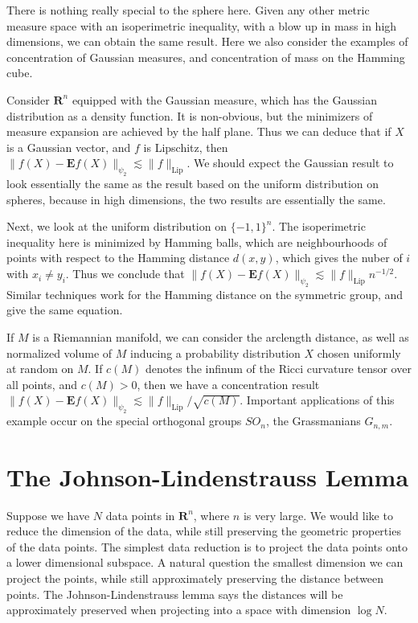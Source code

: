 There is nothing really special to the sphere here. Given any other metric measure space with an isoperimetric inequality, with a blow up in mass in high dimensions, we can obtain the same result. Here we also consider the examples of concentration of Gaussian measures, and concentration of mass on the Hamming cube.

\begin{example}
    Consider $\mathbf{R}^n$ equipped with the Gaussian measure, which has the Gaussian distribution as a density function. It is non-obvious, but the minimizers of measure expansion are achieved by the half plane. Thus we can deduce that if $X$ is a Gaussian vector, and $f$ is Lipschitz, then $\| f(X) - \mathbf{E} f(X) \|_{\psi_2} \lesssim \| f \|_{\text{Lip}}$. We should expect the Gaussian result to look essentially the same as the result based on the uniform distribution on spheres, because in high dimensions, the two results are essentially the same.
\end{example}

\begin{example}
    Next, we look at the uniform distribution on $\{ -1, 1 \}^n$. The isoperimetric inequality here is minimized by Hamming balls, which are neighbourhoods of points with respect to the Hamming distance $d(x,y)$, which gives the nuber of $i$ with $x_i \neq y_i$. Thus we conclude that $\| f(X) - \mathbf{E} f(X) \|_{\psi_2} \lesssim \| f \|_{\text{Lip}} n^{-1/2}$. Similar techniques work for the Hamming distance on the symmetric group, and give the same equation. 
\end{example}

\begin{example}
    If $M$ is a Riemannian manifold, we can consider the arclength distance, as well as normalized volume of $M$ inducing a probability distribution $X$ chosen uniformly at random on $M$. If $c(M)$ denotes the infinum of the Ricci curvature tensor over all points, and $c(M) > 0$, then we have a concentration result $\| f(X) - \mathbf{E} f(X) \|_{\psi_2} \lesssim \| f \|_{\text{Lip}} / \sqrt{c(M)}$. Important applications of this example occur on the special orthogonal groups $SO_n$, the Grassmanians $G_{n,m}$.
\end{example}

\section{The Johnson-Lindenstrauss Lemma}

Suppose we have $N$ data points in $\mathbf{R}^n$, where $n$ is very large. We would like to reduce the dimension of the data, while still preserving the geometric properties of the data points. The simplest data reduction is to project the data points onto a lower dimensional subspace. A natural question the smallest dimension we can project the points, while still approximately preserving the distance between points. The Johnson-Lindenstrauss lemma says the distances will be approximately preserved when projecting into a space with dimension $\log N$.

